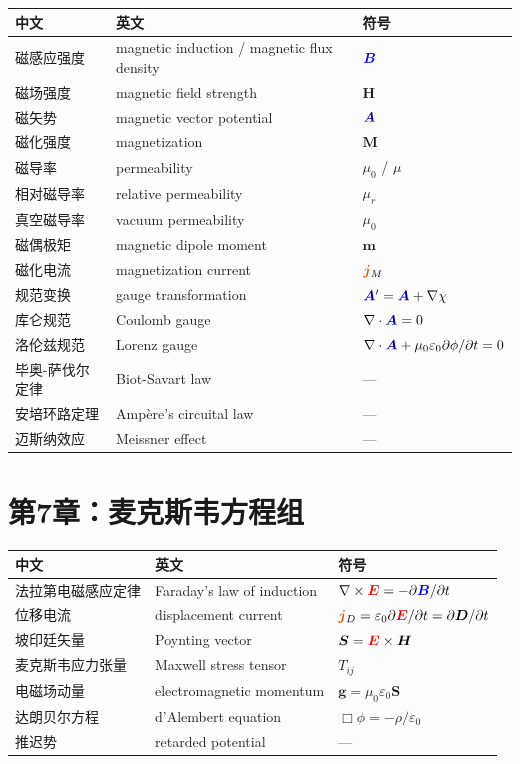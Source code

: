 \documentclass[11pt,a4paper,openany,oneside]{book}
\newcommand{\vecE}{\textcolor{red}{\vect{E}}}
\newcommand{\vecB}{\textcolor{blue}{\vect{B}}}
\newcommand{\vecJ}{\textcolor{cororange}{\vect{j}}}
\newcommand{\vecA}{\textcolor{blue!70!black}{\vect{A}}}
\newcommand{\eps}{\varepsilon}
\newcommand{\muz}{\mu_0}
\newcommand{\vect}[1]{\bm{#1}}
\newcommand{\curl}{\nabla\times}
\begin{document}
\begin{center}
\begin{tabular}{@{}lll@{}}
\toprule
\textbf{中文} & \textbf{英文} & \textbf{符号} \\
\midrule
磁感应强度 & magnetic induction / magnetic flux density & $\vecB$ \\
磁场强度 & magnetic field strength & $\vect{H}$ \\
磁矢势 & magnetic vector potential & $\vecA$ \\
磁化强度 & magnetization & $\vect{M}$ \\
磁导率 & permeability & $\muz$ / $\mu$ \\
相对磁导率 & relative permeability & $\mu_r$ \\
真空磁导率 & vacuum permeability & $\mu_0$ \\
磁偶极矩 & magnetic dipole moment & $\vect{m}$ \\
磁化电流 & magnetization current & $\vecJ_M$ \\
规范变换 & gauge transformation & $\vecA'=\vecA+\nabla\chi$ \\
库仑规范 & Coulomb gauge & $\nabla\cdot\vecA=0$ \\
洛伦兹规范 & Lorenz gauge & $\nabla\cdot\vecA+\muz\eps_0\partial\phi/\partial t=0$ \\
毕奥-萨伐尔定律 & Biot-Savart law & — \\
安培环路定理 & Amp\`ere's circuital law & — \\
迈斯纳效应 & Meissner effect & — \\
\bottomrule
\end{tabular}
\end{center}

\section{第7章：麦克斯韦方程组}

\begin{center}
\begin{tabular}{@{}lll@{}}
\toprule
\textbf{中文} & \textbf{英文} & \textbf{符号} \\
\midrule
法拉第电磁感应定律 & Faraday's law of induction & $\curl\vecE=-\partial\vecB/\partial t$ \\
位移电流 & displacement current & $\vecJ_D=\eps_0\partial\vecE/\partial t=\partial\vect{D}/\partial t$ \\
坡印廷矢量 & Poynting vector & $\vect{S}=\vecE\times\vect{H}$ \\
麦克斯韦应力张量 & Maxwell stress tensor & $T_{ij}$ \\
电磁场动量 & electromagnetic momentum & $\vect{g}=\muz\eps_0\vect{S}$ \\
达朗贝尔方程 & d'Alembert equation & $\Box\phi=-\rho/\eps_0$ \\
推迟势 & retarded potential & — \\
\bottomrule
\end{tabular}
\end{center}
\end{document}
